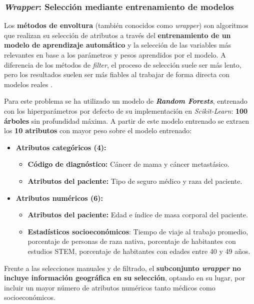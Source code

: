 \subsubsection{\textit{Wrapper}: Selección mediante entrenamiento de modelos}

Los \textbf{métodos de envoltura} (también conocidos como \textit{wrapper}) son algoritmos que realizan su selección de atributos a través del \textbf{entrenamiento de un modelo de aprendizaje automático} y la selección de las variables más relevantes en base a los parámetros y pesos aprendidos por el modelo. A diferencia de los métodos de \textit{filter}, el proceso de selección suele ser más lento, pero los resultados suelen ser más fiables al trabajar de forma directa con modelos reales \cite{featureselection}.

Para este problema se ha utilizado un modelo de \textbf{\textit{Random Forests}}, entrenado con los hiperparámetros por defecto de su implementación en \textit{Scikit-Learn}: \textbf{100 árboles} sin profundidad máxima. A partir de este modelo entrenado se extraen los \textbf{10 atributos} con mayor peso sobre el modelo entrenado: 

\begin{itemize}[parsep=1pt, itemsep=1pt, topsep=4pt]
	\item \textbf{Atributos categóricos (4):} 
	\begin{itemize}[parsep=1pt, itemsep=1pt, topsep=4pt]
		\item \textbf{Código de diagnóstico:} Cáncer de mama y cáncer metastásico.
		\item \textbf{Atributos del paciente:} Tipo de seguro médico y raza del paciente.
	\end{itemize}
	\item \textbf{Atributos numéricos (6):}
	\begin{itemize}[parsep=1pt, itemsep=1pt, topsep=4pt]
		\item \textbf{Atributos del paciente:} Edad e índice de masa corporal del paciente.
		\item \textbf{Estadísticos socioeconómicos}: Tiempo de viaje al trabajo promedio, porcentaje de personas de raza nativa, porcentaje de habitantes con estudios STEM, porcentaje de habitantes con edades entre 40 y 49 años.
	\end{itemize}
\end{itemize}

Frente a las selecciones manuales y de filtrado, el \textbf{subconjunto \textit{wrapper} no incluye información geográfica en su selección}, optando en su lugar, por incluir un mayor número de atributos numéricos tanto médicos como socioeconómicos.

